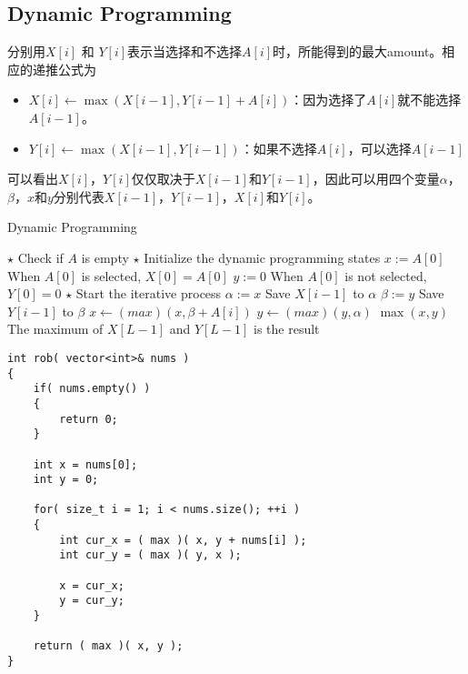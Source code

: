 \subsection{Dynamic Programming}
\begin{CJK*}{UTF8}{gbsn}
分别用$X[i]$ 和 $Y[i]$表示当选择和不选择$A[i]$时，所能得到的最大amount。相应的递推公式为
\begin{itemize}
\item $X[i]\gets\max(X[i-1], Y[i-1] + A[i])$：因为选择了$A[i]$就不能选择$A[i-1]$。
\item $Y[i]\gets\max(X[i-1], Y[i-1])$：如果不选择$A[i]$，可以选择$A[i-1]$
\end{itemize}
可以看出$X[i]$，$Y[i]$仅仅取决于$X[i-1]$和$Y[i-1]$，因此可以用四个变量$\alpha$，$\beta$，$x$和$y$分别代表$X[i-1]$，$Y[i-1]$，$X[i]$和$Y[i]$。
\end{CJK*} 
\setcounter{algorithm}{0}
\begin{algorithm}[H]
\caption{Dynamic Programming}
\begin{algorithmic}[1]
\State $\star$ Check if $A$ is empty
\State {}
\EndIf
\State $\star$ Initialize the dynamic programming states
\State $x:=A[0]$ \Comment When $A[0]$ is selected, $X[0]=A[0]$
\State $y:=0$ \Comment When $A[0]$ is not selected, $Y[0]=0$
\State $\star$ Start the iterative process
\State $\alpha:=x$ \Comment Save $X[i-1]$ to $\alpha$
\State $\beta:=y$ \Comment Save $Y[i-1]$ to $\beta$
\State $x\gets (max)(x, \beta+A[i])$
\State $y\gets (max)(y, \alpha)$
\EndFor
\State \Return $\max(x,y)$ \Comment The maximum of $X[L-1]$ and $Y[L-1]$ is the result
\EndProcedure
\end{algorithmic}
\end{algorithm}        
\setcounter{lstlisting}{0}
\begin{mdframed}[style=mymdf]
\begin{lstlisting}[style=customc, caption={Dynamic Programming}]
int rob( vector<int>& nums )
{
    if( nums.empty() )
    {
        return 0;
    }

    int x = nums[0];
    int y = 0;

    for( size_t i = 1; i < nums.size(); ++i )
    {
        int cur_x = ( max )( x, y + nums[i] );
        int cur_y = ( max )( y, x );

        x = cur_x;
        y = cur_y;
    }

    return ( max )( x, y );
}
\end{lstlisting} 
\end{mdframed}
